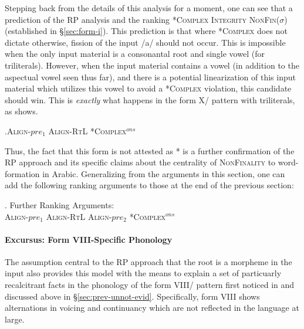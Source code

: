 \documentclass[12pt,twoside,letterpaper]{article}
\begin{document}
Stepping back from the details of this analysis for a moment, one can see that a prediction of the RP analysis and the ranking *\textsc{Complex} \OTdom \textsc{Integrity} \OTdom \textsc{NonFin}($\sigma$) (established in \S{\ref{sec:form-i}}). This prediction is that where *\textsc{Complex} does not dictate otherwise, fission of the input /a/ should not occur. This is impossible when the only input material is a consonantal root and single vowel (for triliterals). However, when the input material contains a vowel (in addition to the aspectual vowel seen thus far), and there is a potential linearization of this input material which utilizes this vowel to avoid a *\textsc{Complex} violation, this candidate should win. This is \emph{exactly} what happens in the form X/{\em {}} pattern with triliterals, as \Next shows.

\ex.\label{tab:formx-unmarked}\textsc{Align}-$pre_1$ \OTdom \textsc{Align-RtL} \OTdom \textsc{*Complex}$^{ons}$\\\begin{OTtableau}{4}
  \end{OTtableau}

Thus, the fact that this form is not attested as *{\em {}} is a further confirmation of the RP approach and its specific claims about the centrality of \textsc{NonFinality} to word-formation in Arabic. Generalizing from the arguments in this section, one can add the following ranking arguments to those at the end of the previous section:

\ex. Further Ranking Arguments:\\\textsc{Align}-$pre_1$ \OTdom \textsc{Align-RtL} \OTdom \textsc{Align-}$pre_2$ \OTdom \textsc{*Complex}$^{ons}$

\paragraph{Excursus: Form VIII-Specific Phonology}
\label{sec:excursus:-form-viii}

The assumption central to the RP approach that the root is a morpheme in the input also provides this model with the means to explain a set of particuarly recalcitrant facts in the phonology of the form VIII/{\em {}} pattern first noticed in \cite{mccarthy79} and discussed above in \S{\ref{sec:prev-unnot-evid}}. Specifically, form VIII shows alternations in voicing and continuancy which are not reflected in the language at large.
\end{document}
